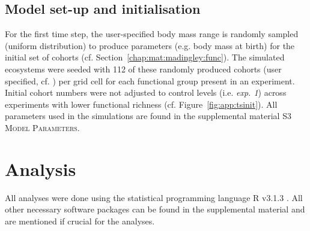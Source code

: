 \subsection{Model set-up and initialisation}
For the first time step, the user-specified body mass range is randomly sampled (uniform distribution) to produce parameters (e.g. body mass at birth) for the initial set of  cohorts (cf. Section~\ref{chap:mat:madingley:func}).
The simulated ecosystems were seeded with 112 of these randomly produced cohorts (user specified, cf. \citealp{Harfoot2014}) per grid cell for each functional group present in an experiment.\\
Initial cohort numbers were not adjusted to control levels (i.e. \textit{exp. 1}) across experiments with lower functional richness (cf. Figure~\ref{fig:app:tsinit}).
All parameters used in the simulations are found in the supplemental material S3 \textsc{Model Parameters}. 

%

\section{Analysis}
\label{chap:mat:analysis}
All analyses were done using the statistical programming language \textsc{R} v3.1.3 \citep{RCT2015}. All other necessary software packages can be found in the supplemental material and are mentioned if crucial for the analyses.
